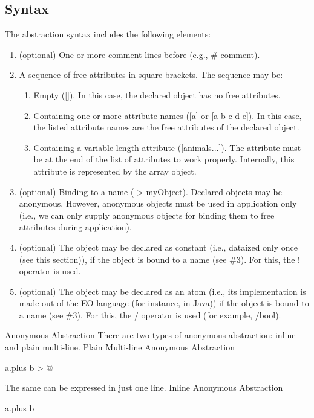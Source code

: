 \documentclass[12pt]{book}
\begin{document}
\subsection{Syntax}
The abstraction syntax includes the following elements:

\begin{enumerate}
    \item (optional) One or more comment lines before (e.g., \# comment).
    \item A sequence of free attributes in square brackets. The sequence may be:
    \begin{enumerate}
        \item Empty ([]). In this case, the declared object has no free attributes.
        \item Containing one or more attribute names ([a] or [a b c d e]). In this case, the listed attribute names are the free attributes of the declared object.
        \item Containing a variable-length attribute ([animals...]). The attribute must be at the end of the list of attributes to work properly. Internally, this attribute is represented by the array object.
    \end{enumerate}
    \item (optional) Binding to a name ( > myObject). Declared objects may be anonymous. However, anonymous objects must be used in application only (i.e., we can only supply anonymous objects for binding them to free attributes during application).
    \item (optional) The object may be declared as constant (i.e., dataized only once (see this section)), if the object is bound to a name (see \#3). For this, the ! operator is used.
    \item (optional) The object may be declared as an atom (i.e., its implementation is made out of the EO language (for instance, in Java)) if the object is bound to a name (see \#3). For this, the / operator is used (for example, /bool).
\end{enumerate}
Anonymous Abstraction
There are two types of anonymous abstraction: inline and plain multi-line.
Plain Multi-line Anonymous Abstraction

\begin{ffcode}
[a b]
  a.plus b > @
\end{ffcode}

The same can be expressed in just one line.
Inline Anonymous Abstraction

\begin{ffcode}
[a b] a.plus b
\end{ffcode}
\end{document}
